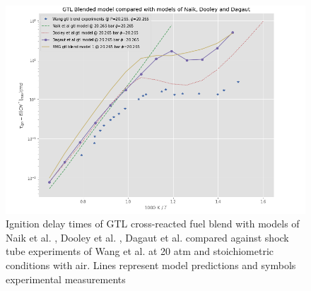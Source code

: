\begin{figure}[hbp]
    \centering
    \includegraphics[scale=0.5, keepaspectratio]{images/GTL_model_blend_idt.png}
    \caption{Ignition delay times of GTL cross-reacted fuel blend with models of Naik et al. \cite{Naik2011DetailedFuels}, Dooley et al. \cite{Dooley2010AProperties}, Dagaut et al. \cite{Dagaut2014} compared against shock tube experiments of Wang et al. \cite{Wang2012} at 20 atm and stoichiometric conditions with air. Lines represent model predictions and symbols experimental measurements}
    \label{fig:gtl-blend-idt}
\end{figure}